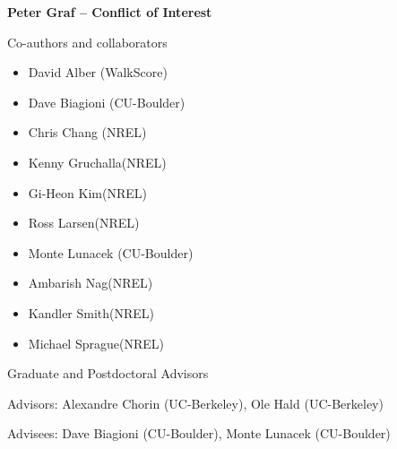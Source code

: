 \documentclass[11pt]{article}
\begin{document}
\begin{center}
{\large{\bf Peter Graf -- Conflict of Interest}} \\
\end{center}

\vspace{.2 true in}

Co-authors and collaborators
\begin{itemize}
\item David Alber (WalkScore)
\item Dave Biagioni (CU-Boulder)
\item Chris Chang (NREL)
\item Kenny Gruchalla(NREL)
\item Gi-Heon Kim(NREL)
\item Ross Larsen(NREL)
\item Monte Lunacek (CU-Boulder)
\item Ambarish Nag(NREL)
\item Kandler Smith(NREL)
\item Michael Sprague(NREL) 
\end{itemize}


\vspace{.2 true in}
Graduate and Postdoctoral Advisors

\vspace{.1in}
Advisors: Alexandre Chorin (UC-Berkeley), Ole Hald (UC-Berkeley)

\vspace{.1in}
Advisees: Dave Biagioni (CU-Boulder), Monte Lunacek (CU-Boulder)
\end{document}

